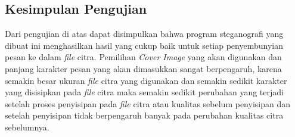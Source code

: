 	\subsection{Kesimpulan Pengujian}
	Dari pengujian di atas dapat disimpulkan bahwa program steganografi yang dibuat ini menghasilkan hasil yang cukup baik untuk setiap penyembunyian pesan ke dalam \emph{file} citra. Pemilihan \emph{Cover Image} yang akan digunakan dan panjang karakter pesan yang akan dimasukkan sangat berpengaruh, karena semakin besar ukuran \emph{file} citra yang digunakan dan semakin sedikit karakter yang disisipkan pada \emph{file} citra maka semakin sedikit perubahan yang terjadi setelah proses penyisipan pada \emph{file} citra atau kualitas sebelum penyisipan dan setelah penyisipan tidak berpengaruh banyak pada perubahan kualitas citra sebelumnya.
	